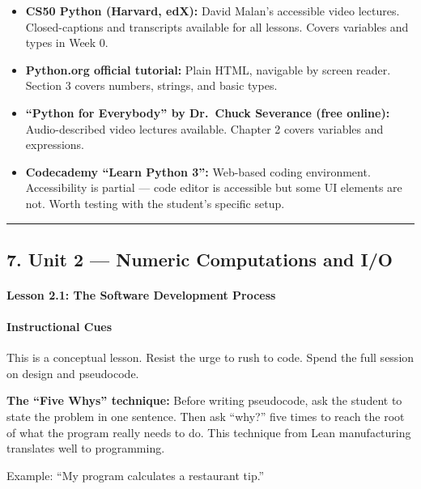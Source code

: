 \documentclass[
  justified,
  openright,
]{tufte-book}
\let\subsubsection\paragraph
\let\paragraph\paragraph
\let\subsubsection\paragraph
\let\paragraph\paragraph
\providecommand{\tightlist}{%
  \setlength{\itemsep}{0pt}\setlength{\parskip}{0pt}}
\begin{document}
\begin{itemize}
\tightlist
\item
  \textbf{CS50 Python (Harvard, edX):} David Malan's accessible video
  lectures. Closed-captions and transcripts available for all lessons.
  Covers variables and types in Week 0.
\item
  \textbf{Python.org official tutorial:} Plain HTML, navigable by screen
  reader. Section 3 covers numbers, strings, and basic types.
\item
  \textbf{``Python for Everybody'' by Dr.~Chuck Severance (free
  online):} Audio-described video lectures available. Chapter 2 covers
  variables and expressions.
\item
  \textbf{Codecademy ``Learn Python 3'':} Web-based coding environment.
  Accessibility is partial --- code editor is accessible but some UI
  elements are not. Worth testing with the student's specific setup.
\end{itemize}

\begin{center}\rule{0.5\linewidth}{0.5pt}\end{center}

\subsection{7. Unit 2 --- Numeric Computations and
I/O}\label{unit-2-numeric-computations-and-io}

\subsubsection{Lesson 2.1: The Software Development
Process}\label{lesson-2.1-the-software-development-process}

\paragraph{Instructional Cues}\label{instructional-cues-5}

This is a conceptual lesson. Resist the urge to rush to code. Spend the
full session on design and pseudocode.

\textbf{The ``Five Whys'' technique:} Before writing pseudocode, ask the
student to state the problem in one sentence. Then ask ``why?'' five
times to reach the root of what the program really needs to do. This
technique from Lean manufacturing translates well to programming.

Example: ``My program calculates a restaurant tip.''
\end{document}
